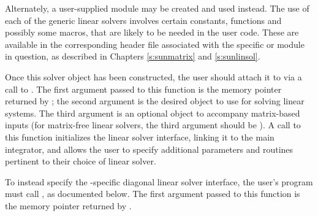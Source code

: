 Alternately, a user-supplied
 module may be created and used instead.  The use
of each of the generic linear solvers involves certain constants,
functions and possibly some macros, that are likely to be needed in
the user code.  These are available in the corresponding header file
associated with the specific {\sunmatrix} or {\sunlinsol} module in
question, as described in Chapters \ref{s:sunmatrix} and
\ref{s:sunlinsol}.

Once this solver object has been constructed, the user should attach
it to {\cvodes} via a call to .  The first
argument passed to this function is the {\cvodes} memory pointer
returned by ; the second argument is the desired
{\sunlinsol} object to use for solving linear systems.  The third
argument is an optional {\sunmatrix} object to accompany matrix-based
{\sunlinsol} inputs (for matrix-free linear solvers, the third
argument should be ).  A call to this function initializes
the {\cvls} linear solver interface, linking it to the main {\cvodes}
integrator, and allows the user to specify additional parameters and
routines pertinent to their choice of linear solver.

To instead specify the {\cvodes}-specific diagonal linear solver
interface, the user's program must call , as documented
below.  The first argument passed to this function is the {\cvodes}
memory pointer returned by .

